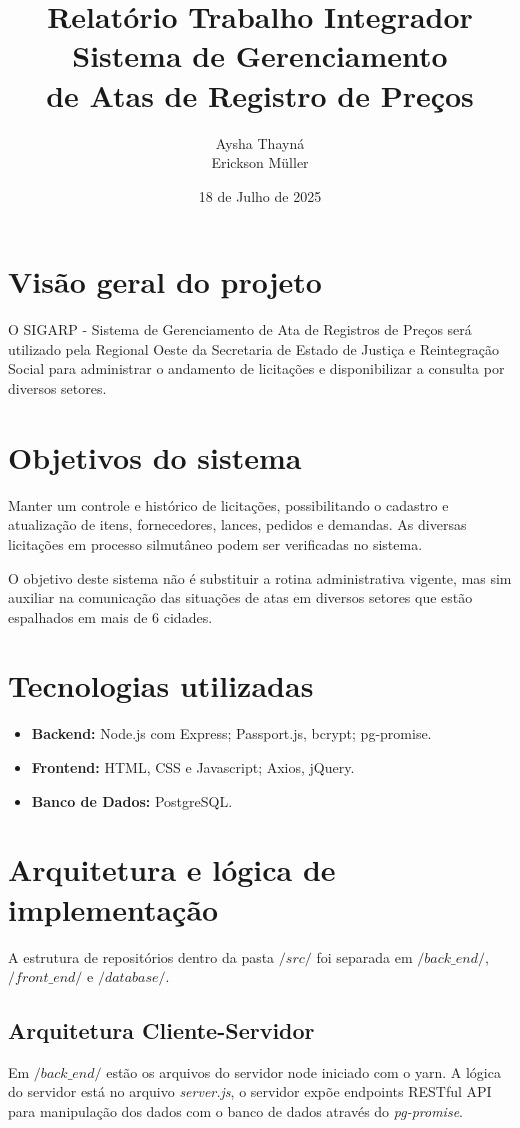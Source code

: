 \documentclass[ ]{article}
\title{Relatório Trabalho Integrador\\Sistema de Gerenciamento\\de Atas de Registro de Preços}
\date{18 de Julho de 2025}
\author{Aysha Thayná\\ Erickson Müller}
\begin{document}
	\maketitle
	\newpage
	\section{Visão geral do projeto}
		O SIGARP - Sistema de Gerenciamento de Ata de Registros de Preços será utilizado pela Regional Oeste da Secretaria de Estado de Justiça e Reintegração Social para administrar o andamento de licitações e disponibilizar a consulta por diversos setores.
	\section{Objetivos do sistema}
		Manter um controle e histórico de licitações, possibilitando o cadastro e atualização de itens, fornecedores, lances, pedidos e demandas. As diversas licitações em processo silmutâneo podem ser verificadas no sistema.
		
		O objetivo deste sistema não é substituir a rotina administrativa vigente, mas sim auxiliar na comunicação das situações de atas em diversos setores que estão espalhados em mais de 6 cidades.
		
	\section{Tecnologias utilizadas}
		\begin{itemize}
			\item \textbf{Backend:} Node.js com Express; Passport.js, bcrypt; pg-promise.
			\item \textbf{Frontend:} HTML, CSS e Javascript; Axios, jQuery.
			\item \textbf{Banco de Dados:} PostgreSQL.
		\end{itemize}
	\section{Arquitetura e lógica de implementação}
		A estrutura de repositórios dentro da pasta $/src/$ foi separada em $/back\_end/$, $/front\_end/$ e $/database/$. 
		\subsection{Arquitetura Cliente-Servidor}
			Em $/back\_end/$ estão os arquivos do servidor node iniciado com o yarn. A lógica do servidor está no arquivo \textit{server.js}, o servidor expõe endpoints RESTful API para manipulação dos dados com o banco de dados através do \textit{pg-promise}.
			
\end{document}
